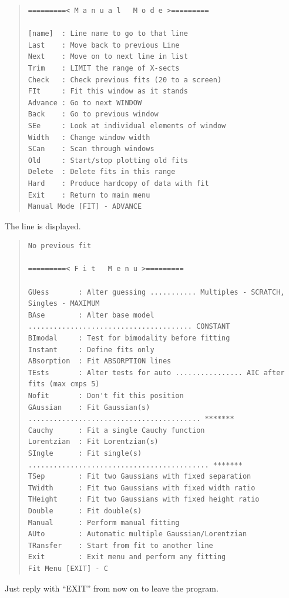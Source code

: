 \documentclass[11pt,twoside]{article}
\begin{document}
\begin{quote}
\begin{small}
\begin{verbatim}
=========< M a n u a l   M o d e >=========

[name]  : Line name to go to that line
Last    : Move back to previous Line
Next    : Move on to next line in list
Trim    : LIMIT the range of X-sects
Check   : Check previous fits (20 to a screen)
FIt     : Fit this window as it stands
Advance : Go to next WINDOW
Back    : Go to previous window
SEe     : Look at individual elements of window
Width   : Change window width
SCan    : Scan through windows
Old     : Start/stop plotting old fits
Delete  : Delete fits in this range
Hard    : Produce hardcopy of data with fit
Exit    : Return to main menu
Manual Mode [FIT] - ADVANCE
\end{verbatim}\end{small}\end{quote}

The line is displayed.

\begin{quote}\begin{small}\begin{verbatim}
No previous fit

=========< F i t   M e n u >=========

GUess       : Alter guessing ........... Multiples - SCRATCH, Singles - MAXIMUM
BAse        : Alter base model ....................................... CONSTANT
BImodal     : Test for bimodality before fitting
Instant     : Define fits only
ABsorption  : Fit ABSORPTION lines
TEsts       : Alter tests for auto ................ AIC after fits (max cmps 5)
Nofit       : Don't fit this position
GAussian    : Fit Gaussian(s) ......................................... *******
Cauchy      : Fit a single Cauchy function
Lorentzian  : Fit Lorentzian(s)
SIngle      : Fit single(s) ........................................... *******
TSep        : Fit two Gaussians with fixed separation
TWidth      : Fit two Gaussians with fixed width ratio
THeight     : Fit two Gaussians with fixed height ratio
Double      : Fit double(s)
Manual      : Perform manual fitting
AUto        : Automatic multiple Gaussian/Lorentzian
TRansfer    : Start from fit to another line
Exit        : Exit menu and perform any fitting
Fit Menu [EXIT] - C
\end{verbatim}\end{small}\end{quote}

Just reply with ``EXIT'' from now on to leave the program.
\end{document}
